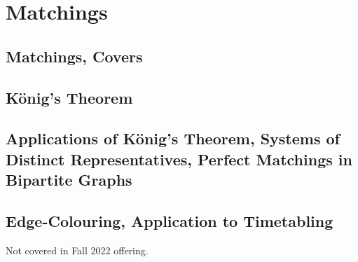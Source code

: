 \section{Matchings}

\setcounter{subsection}{1}
\subsection{Matchings, Covers}

\subsection{K\"onig's Theorem}

\setcounter{subsection}{5}
\subsection{Applications of K\"onig's Theorem, Systems of Distinct Representatives, Perfect Matchings in Bipartite Graphs}

\setcounter{subsection}{7}
\subsection{Edge-Colouring, Application to Timetabling}

Not covered in Fall 2022 offering.
